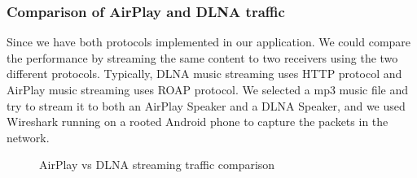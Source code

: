 \subsubsection{Comparison of AirPlay and DLNA traffic}
Since we have both protocols implemented in our application. We could
compare the performance by streaming the same content to two receivers using the
two different protocols. Typically, DLNA music streaming uses HTTP protocol and
AirPlay music streaming uses ROAP protocol. We selected a mp3 music file and
try to stream it to both an AirPlay Speaker and a DLNA Speaker, and we used
Wireshark running on a rooted Android phone to capture the packets in the
network.
\begin{figure}[hb]
\caption{AirPlay vs DLNA streaming traffic
comparison \label{airplay_vs_dlna_traffic}}
\end{figure}

